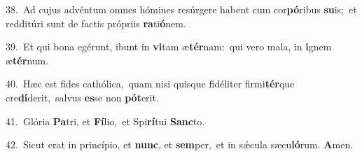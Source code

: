 {\numbfont\textcolor{\numbcolor}{38.}}~Ad cujus advéntum omnes hómines resúrgere habent cum cor\-\textbf{pó}\-ribus \textbf{su}\-is;~\star et redditúri sunt de factis própriis \textbf{ra}\-ti\-\textbf{ó}\-nem.\par
{\numbfont\textcolor{\numbcolor}{39.}}~Et qui bona egérunt, ibunt in \textbf{vi}\-tam æ\-\textbf{tér}\-nam:~\star qui vero mala, in \textbf{i}\-gnem æ\-\textbf{tér}\-num.\par
{\numbfont\textcolor{\numbcolor}{40.}}~Hæc est fides cathólica,~\dagger quam nisi quisque fidéliter firmi\-\textbf{tér}\-que cre\-\textbf{dí}\-derit,~\star salvus \textbf{es}\-se non \textbf{pót}\-erit.\par
{\numbfont\textcolor{\numbcolor}{41.}}~Glória \textbf{Pa}\-tri, et \textbf{Fí}\-lio,~\star et Spi\-\textbf{rí}\-tui \textbf{Sanc}\-to.\par
{\numbfont\textcolor{\numbcolor}{42.}}~Sicut erat in princípio, et \textbf{nunc}\-, et \textbf{sem}\-per,~\star et in sǽcula sæcu\-\textbf{ló}\-rum. \textbf{A}\-men.\par
